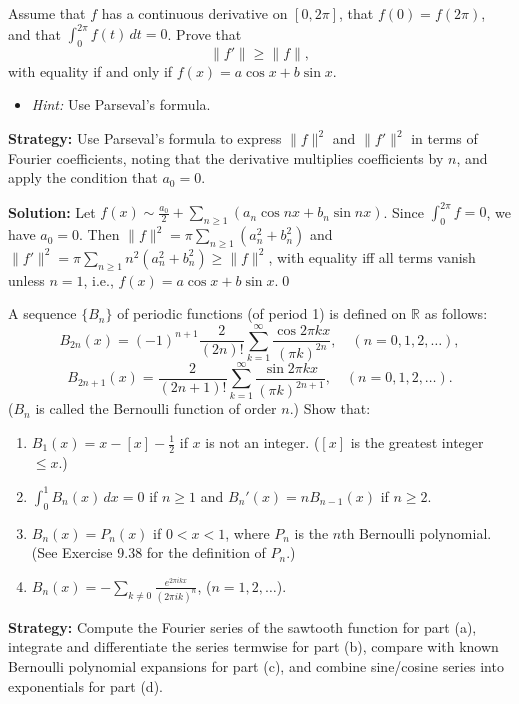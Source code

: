 \begin{problembox}
Assume that $f$ has a continuous derivative on $[0, 2\pi]$, that $f(0) = f(2\pi)$, and that $\int_0^{2\pi} f(t) \, dt = 0$. Prove that
\[
\|f'\| \geq \|f\|,
\]
with equality if and only if $f(x) = a \cos x + b \sin x$.
\begin{itemize}
\item \textit{Hint:} Use Parseval's formula.
\end{itemize}
\end{problembox}

\noindent\textbf{Strategy:} Use Parseval's formula to express $\|f\|^2$ and $\|f'\|^2$ in terms of Fourier coefficients, noting that the derivative multiplies coefficients by $n$, and apply the condition that $a_0=0$.

\bigskip\noindent\textbf{Solution:}
Let $f(x)\sim \tfrac{a_0}{2}+\sum_{n\ge1}(a_n\cos nx+b_n\sin nx)$. Since $\int_0^{2\pi}f=0$, we have $a_0=0$. Then $\|f\|^2=\pi\sum_{n\ge1}(a_n^2+b_n^2)$ and $\|f'\|^2=\pi\sum_{n\ge1} n^2(a_n^2+b_n^2)\ge\|f\|^2$, with equality iff all terms vanish unless $n=1$, i.e., $f(x)=a\cos x+b\sin x$.\qed


\begin{problembox}
A sequence $\{B_n\}$ of periodic functions (of period 1) is defined on $\mathbb{R}$ as follows:
\[
B_{2n}(x) = (-1)^{n+1} \frac{2}{(2n)!} \sum_{k=1}^\infty \frac{\cos 2\pi k x}{(\pi k)^{2n}}, \quad (n = 0, 1, 2, \dots),
\]
\[
B_{2n+1}(x) = \frac{2}{(2n + 1)!} \sum_{k=1}^\infty \frac{\sin 2\pi k x}{(\pi k)^{2n+1}}, \quad (n = 0, 1, 2, \dots).
\]
($B_n$ is called the Bernoulli function of order $n$.) Show that:
\begin{enumerate}[label=(\alph*)]
\item $B_1(x) = x - [x] - \frac{1}{2}$ if $x$ is not an integer. ($[x]$ is the greatest integer $\leq x$.)
\item $\int_0^1 B_n(x) \, dx = 0$ if $n \geq 1$ and $B_n'(x) = n B_{n-1}(x)$ if $n \geq 2$.
\item $B_n(x) = P_n(x)$ if $0 < x < 1$, where $P_n$ is the $n$th Bernoulli polynomial. (See Exercise 9.38 for the definition of $P_n$.)
\item $B_n(x) = -\sum_{k \neq 0} \frac{e^{2\pi i k x}}{(2\pi i k)^n}$, ($n = 1, 2, \dots$).
\end{enumerate}
\end{problembox}

\noindent\textbf{Strategy:} Compute the Fourier series of the sawtooth function for part (a), integrate and differentiate the series termwise for part (b), compare with known Bernoulli polynomial expansions for part (c), and combine sine/cosine series into exponentials for part (d).

